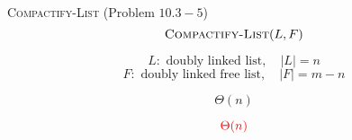 
% 
% 

\begin{frame}{}
  \begin{exampleblock}{\textsc{Compactify-List} (Problem $10.3-5$)}
    \[
      \textsc{Compactify-List}(L, F)
    \]

    \[
      L: \text{ doubly linked list},\quad |L| = n
    \]
    \[
      F: \text{ doubly linked free list},\quad |F| = m - n
    \]

    \[
      \Theta(n)
    \]
  \end{exampleblock}

\end{frame}

\begin{frame}{}

  \pause
  \centerline{}

  \pause
  \[
    \textcolor{red}{\Theta(n)}
  \]
\end{frame}

\begin{frame}{}
  \centerline{}
  \vspace{0.60cm}
\end{frame}
